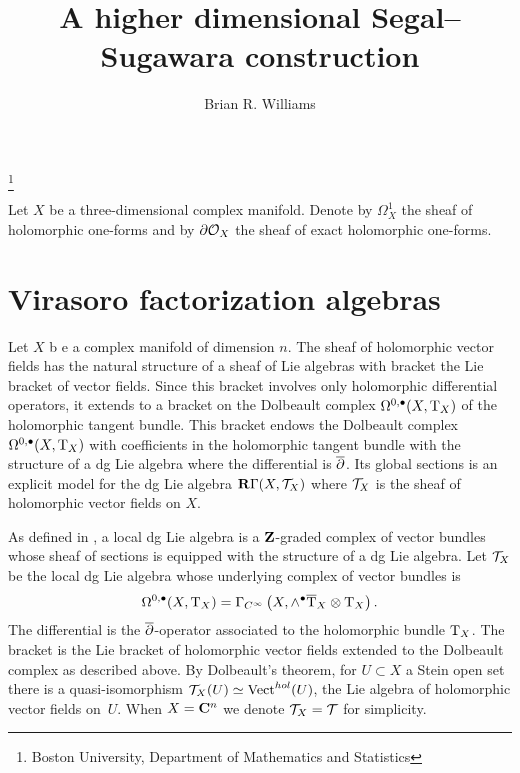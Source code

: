 \documentclass[11pt]{amsart}
\renewcommand{\op}{\operatorname}
\begin{document}
\title{A higher dimensional Segal--Sugawara construction}
\author{Brian R. Williams}
\thanks{Boston University, Department of Mathematics and Statistics}
\maketitle

Let $X$ be a three-dimensional complex manifold. Denote by $\Omega^1_X$ the sheaf of holomorphic one-forms and by $\partial \mathcal O_X$ the sheaf of exact holomorphic one-forms.

\section{Virasoro factorization algebras}

Let $X$ b
e a complex manifold of dimension $n$.
The sheaf of holomorphic vector fields has the natural structure of a sheaf of Lie algebras with bracket the Lie bracket of vector fields.
Since this bracket involves only holomorphic differential operators, it extends to a bracket on the Dolbeault complex $\Omega^{0,\bullet}(X,{\rm T}_X)$ of the holomorphic tangent bundle.
This bracket endows the Dolbeault complex $\Omega^{0,\bullet}(X, {\rm T}_X)$ with coefficients in the holomorphic tangent bundle with the structure of a dg Lie algebra where the differential is $\overline{\partial}$.
Its global sections is an explicit model for the dg Lie algebra $\mathbf{R}\Gamma(X , \mathcal T_X)$ where $\mathcal T_X$ is the sheaf of holomorphic vector fields on $X$.

As defined in \cite{CG2}, a local dg Lie algebra is a $\mathbf{Z}$-graded complex of vector bundles whose sheaf of sections is equipped with the structure of a dg Lie algebra.
Let $\mathcal T_X$ be the local dg Lie algebra whose underlying complex of vector bundles is
\begin{equation}
\Omega^{0,\bullet}(X, {\rm T}_X) = \Gamma_{C^\infty} \left(X , \wedge^\bullet \overline {{\rm T}}_X \otimes {\rm T}_X \right) .
\end{equation}
The differential is the $\overline{\partial}$-operator associated to the holomorphic bundle ${\rm T}_X$.
The bracket is the Lie bracket of holomorphic vector fields extended to the Dolbeault complex as described above.
By Dolbeault's theorem, for $U \subset X$ a Stein open set there is a quasi-isomorphism $\cT_X(U) \simeq \op{Vect}^{hol}(U)$, the Lie algebra of holomorphic vector fields on~$U$.
When $X = \mathbf{C}^n$ we denote $\mathcal T_X = \mathcal T$ for simplicity.
\end{document}
